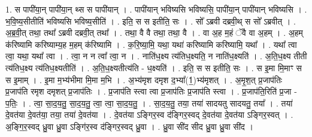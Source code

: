\documentclass[17pt]{extarticle}
\begin{document}
1. स पापी॑या॒न् पापी॑या॒न् थ्स स पापी॑यान् । . पापी॑यान् भविष्यसि भविष्यसि॒ पापी॑या॒न् पापी॑यान् भविष्यसि । . भ॒वि॒ष्य॒सीतीति॑ भविष्यसि भविष्य॒सीति॑ । . इति॒ स स इतीति॒ सः । . सो᳚ ऽब्रवी दब्रवी॒थ् स सो᳚ ऽब्रवीत् । . अ॒ब्र॒वी॒त् तथा॒ तथा᳚ ऽब्रवी दब्रवी॒त् तथा᳚ । . तथा॒ वै वै तथा॒ तथा॒ वै । . वा अ॒ह म॒हं ॅवै वा अ॒हम् । . अ॒हम् क॑रिष्यामि करिष्याम्य॒ह म॒हम् क॑रिष्यामि । . क॒रि॒ष्या॒मि॒ यथा॒ यथा॑ करिष्यामि करिष्यामि॒ यथा᳚ । . यथा᳚ त्वा त्वा॒ यथा॒ यथा᳚ त्वा । . त्वा॒ न न त्वा᳚ त्वा॒ न । . नाति॑ध॒क्ष्य त्य॑तिध॒क्ष्यति॒ न नाति॑ध॒क्ष्यति॑ । . अ॒ति॒ध॒क्ष्य तीती त्य॑तिध॒क्ष्य त्य॑तिध॒क्ष्यतीति॑ । . अ॒ति॒ध॒क्ष्यतीत्य॑ति - ध॒क्ष्यति॑ । . इति॒ स स इतीति॒ सः । . स इ॒मा मि॒माꣳ स स इ॒माम् । . इ॒मा म॒भ्य॑भीमा मि॒मा म॒भि । . अ॒भ्य॑मृश दमृश द॒भ्या᳚(1॒)भ्य॑मृशत् । . अ॒मृ॒श॒त् प्र॒जाप॑तिः प्र॒जाप॑ति रमृश दमृशत् प्र॒जाप॑तिः । . प्र॒जाप॑ति स्त्वा त्वा प्र॒जाप॑तिः प्र॒जाप॑ति स्त्वा । . प्र॒जाप॑ति॒रिति॑ प्र॒जा - प॒तिः॒ । . त्वा॒ सा॒द॒य॒तु॒ सा॒द॒य॒तु॒ त्वा॒ त्वा॒ सा॒द॒य॒तु॒ । . सा॒द॒य॒तु॒ तया॒ तया॑ सादयतु सादयतु॒ तया᳚ । . तया॑ दे॒वत॑या दे॒वत॑या॒ तया॒ तया॑ दे॒वत॑या । . दे॒वत॑या ऽङ्गिर॒स्व द॑ङ्गिर॒स्वद् दे॒वत॑या दे॒वत॑या ऽङ्गिर॒स्वत् । . अ॒ङ्गि॒र॒स्वद् ध्रु॒वा ध्रु॒वा ऽङ्गि॑र॒स्व द॑ङ्गिर॒स्वद् ध्रु॒वा । . ध्रु॒वा सी॑द सीद ध्रु॒वा ध्रु॒वा सी॑द । \newline
\end{document}
